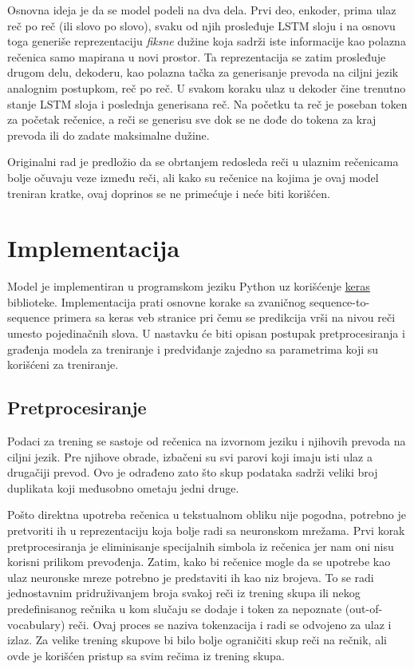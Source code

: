 \documentclass[a4paper]{article}
\begin{document}
Osnovna ideja je da se model podeli na dva dela.
Prvi deo, enkoder, prima ulaz reč po reč (ili slovo po slovo), svaku od njih prosleđuje LSTM sloju i na osnovu toga generiše reprezentaciju \textit{fiksne} dužine koja sadrži iste informacije kao polazna rečenica samo mapirana u novi prostor.
Ta reprezentacija se zatim prosleđuje drugom delu, dekoderu, kao polazna tačka za generisanje prevoda na ciljni jezik analognim postupkom, reč po reč. U svakom koraku ulaz u dekoder čine trenutno stanje LSTM sloja i poslednja generisana reč.
Na početku ta reč je poseban token za početak rečenice, a reči se generisu sve dok se ne dođe do tokena za kraj prevoda ili do zadate maksimalne dužine.

Originalni rad je predložio da se obrtanjem redosleda reči u ulaznim rečenicama bolje očuvaju veze između reči, ali kako su rečenice na kojima je ovaj model treniran kratke, ovaj doprinos se ne primećuje i neće biti korišćen.

\section{Implementacija}

Model je implementiran u programskom jeziku Python uz korišćenje \href{https://keras.io/}{keras} biblioteke. Implementacija prati osnovne korake sa zvaničnog sequence-to-sequence primera sa keras veb stranice \cite{keras_seq2seq} pri čemu se predikcija vrši na nivou reči umesto pojedinačnih slova.
U nastavku će biti opisan postupak pretprocesiranja i građenja modela za treniranje i predviđanje zajedno sa parametrima koji su korišćeni za treniranje.

\subsection{Pretprocesiranje}

Podaci za trening se sastoje od rečenica na izvornom jeziku i njihovih prevoda na ciljni jezik.
Pre njihove obrade, izbačeni su svi parovi koji imaju isti ulaz a drugačiji prevod. Ovo je odrađeno zato što skup podataka sadrži veliki broj duplikata koji međusobno ometaju jedni druge.

Pošto direktna upotreba rečenica u tekstualnom obliku nije pogodna, potrebno je pretvoriti ih u reprezentaciju koja bolje radi sa neuronskom mrežama.
Prvi korak pretprocesiranja je eliminisanje specijalnih simbola iz rečenica jer nam oni nisu korisni prilikom prevođenja.
Zatim, kako bi rečenice mogle da se upotrebe kao ulaz neuronske mreze potrebno je predstaviti ih kao niz brojeva. To se radi jednostavnim pridruživanjem broja svakoj reči iz trening skupa ili nekog predefinisanog rečnika u kom slučaju se dodaje i token za nepoznate (out-of-vocabulary) reči. Ovaj proces se naziva tokenzacija i radi se odvojeno za ulaz i izlaz.
Za velike trening skupove bi bilo bolje ograničiti skup reči na rečnik, ali ovde je korišćen pristup sa svim rečima iz trening skupa.
\end{document}
